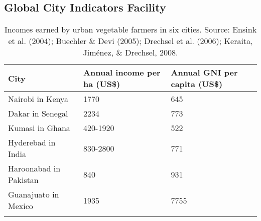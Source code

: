 \begin{landscape}

\chapter{Global City Indicators Facility} %

\label{AppendixB} %

\begin{table}[th]
\caption{Incomes earned by urban vegetable farmers in six cities. Source: Ensink et al. (2004); Buechler \& Devi (2005); Drechsel et al. (2006); Keraita, Jiménez, \& Drechsel, 2008.}
\begin{center}
\begin{tabular}{ p{} p{} p{} } 
\hline
City & Annual income per ha (US\$) & Annual GNI per capita (US\$) \\
\hline
Nairobi in Kenya & 1770 & 645 \\
Dakar in Senegal & 2234 & 773 \\
Kumasi in Ghana & 420-1920 & 522 \\
Hyderebad in India & 830-2800 & 771 \\
Haroonabad in Pakistan & 840 & 931 \\
Guanajuato in Mexico & 1935 & 7755 \\
\hline
\label{tbl:incomesByUfarmens}
\end{tabular}
\end{center}
\end{table}

\end{landscape}